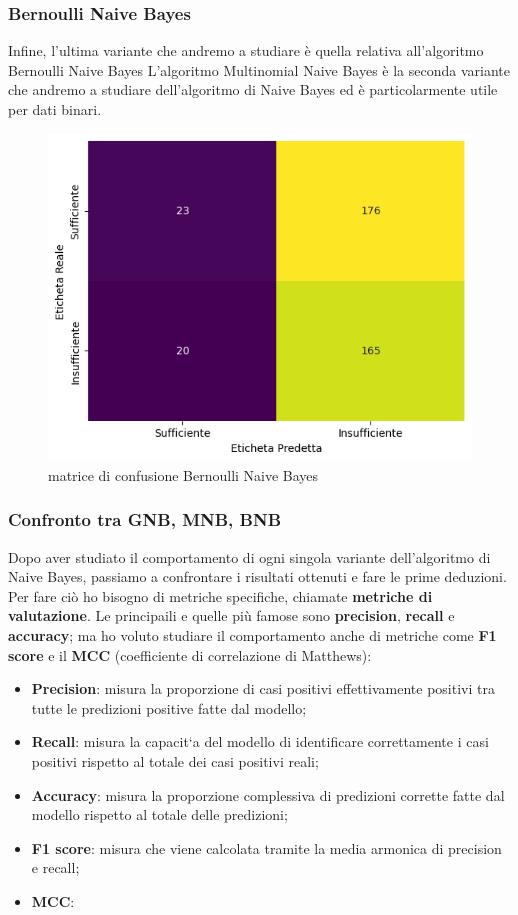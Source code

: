 \documentclass{article}
\begin{document}
\begin{titlepage}
        \subsubsection{Bernoulli Naive Bayes}
        Infine, l'ultima variante che andremo a studiare è quella relativa all'algoritmo Bernoulli Naive Bayes L'algoritmo Multinomial Naive Bayes è la seconda variante che andremo a studiare dell'algoritmo di Naive Bayes ed è particolarmente utile per dati binari.
        \begin{figure}[ht]
            \centering
            \includegraphics[width=0.6\linewidth]{confusion_matrix-BNB.png}
            \caption{  matrice di confusione Bernoulli Naive Bayes}
            \label{fig:enter-label}
        \end{figure}

        \subsubsection{Confronto tra GNB, MNB, BNB}
        Dopo aver studiato il comportamento di ogni singola variante dell'algoritmo di Naive Bayes, passiamo a confrontare i risultati ottenuti e fare le prime deduzioni. Per fare ciò ho bisogno di metriche specifiche, chiamate \textbf{metriche di valutazione}. Le principaili e quelle più famose sono \textbf{precision}, \textbf{recall} e \textbf{accuracy}; ma ho voluto studiare il comportamento anche di metriche come \textbf{F1 score} e il \textbf{MCC} (coefficiente di correlazione di Matthews):
        \begin{itemize}
            \item \textbf{Precision}: misura la proporzione di casi positivi effettivamente positivi tra tutte le predizioni positive fatte dal modello;
            \item \textbf{Recall}: misura la capacit`a del modello di identificare correttamente i casi positivi rispetto al totale dei casi positivi reali;
            \item \textbf{Accuracy}: misura la proporzione complessiva di predizioni corrette fatte dal modello rispetto al totale delle predizioni;
            \item \textbf{F1 score}: misura che viene calcolata tramite la media armonica di precision e recall;
            \item \textbf{MCC}: 
        \end{itemize}
\end{titlepage}
\end{document}
